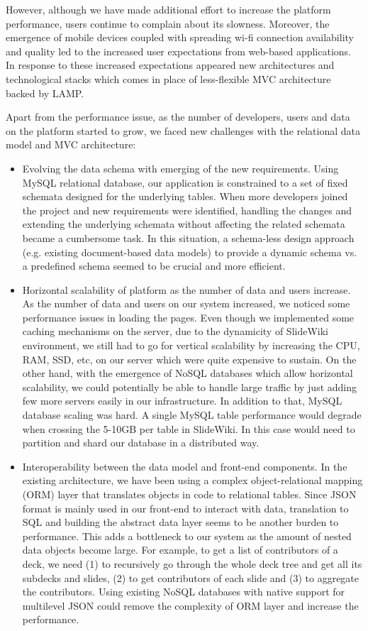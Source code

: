 \documentclass[ngerman,UKenglish,table]{scrbook}
\begin{document}
However, although we have made additional effort to increase the platform performance, users continue to complain about its slowness.
Moreover, the emergence of mobile devices coupled with spreading wi-fi connection availability and quality led to the increased user expectations from web-based applications.
In response to these increased expectations appeared new architectures and technological stacks which comes in place of less-flexible MVC architecture backed by LAMP. 

Apart from the performance issue, as the number of developers, users and data on the platform started to grow, we faced new challenges with the relational data model and MVC architecture:

\begin{itemize}
\item{Evolving the data schema with emerging of the new requirements.} 
Using MySQL relational database, our application is constrained to a set of fixed schemata designed for the underlying tables.
When more developers joined the project and new requirements were identified, handling the changes and extending the underlying  schemata without affecting the related schemata became a cumbersome task.
In this situation, a schema-less design approach (e.g. existing document-based data models) to provide a dynamic schema vs. a predefined schema seemed to be crucial and more efficient.

\item{Horizontal scalability of platform as the number of data and users increase.}
As the number of data and users on our system increased, we noticed some performance issues in loading the pages.
Even though we implemented some caching mechanisms on the server, due to the dynamicity of SlideWiki environment, we still had to go for vertical scalability by increasing the CPU, RAM, SSD, etc, on our server which were quite expensive to sustain.
On the other hand, with the emergence of NoSQL databases which allow horizontal scalability, we could potentially be able to handle large traffic by just adding few more servers easily in our infrastructure.
In addition to that, MySQL database scaling was hard.
A single MySQL table performance would degrade when crossing the 5-10GB per table in SlideWiki.
In this case would need to partition and shard our database in a distributed way.

\item{Interoperability between the data model and front-end components.}
In the existing architecture, we have been using a complex object-relational mapping (ORM) layer that translates objects in code to relational tables.
Since JSON format is mainly used in our front-end to interact with data, translation to SQL and building the abstract data layer seems to be another burden to performance.
This adds a bottleneck to our system as the amount of nested data objects become large.
For example, to get a list of contributors of a deck, we need (1) to recursively go through the whole deck tree and get all its subdecks and slides, (2) to get contributors of each slide and (3) to aggregate the contributors.
Using existing NoSQL databases with native support for multilevel JSON could remove the complexity of ORM layer and increase the performance.


\end{itemize}
\end{document}
